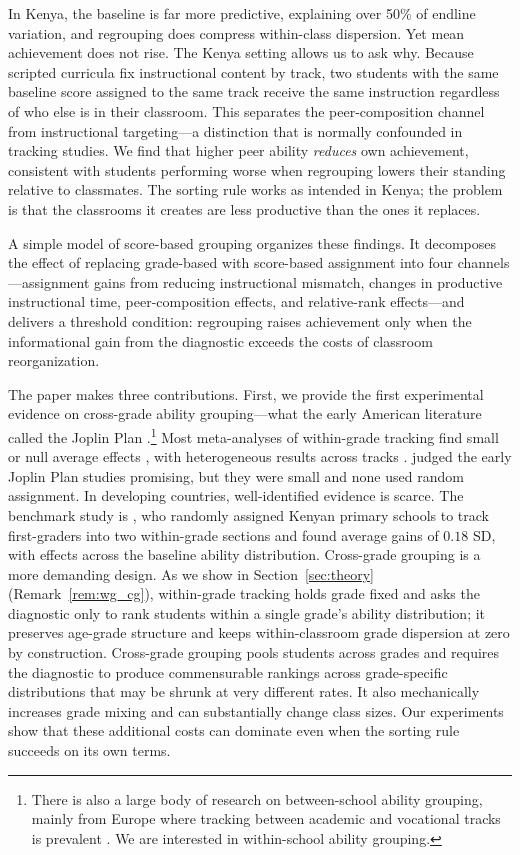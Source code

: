 \documentclass[11pt]{article}
\begin{document}
In Kenya, the baseline is far more predictive, explaining over 50\% of endline variation, and regrouping does compress within-class dispersion. Yet mean achievement does not rise. The Kenya setting allows us to ask why. Because scripted curricula fix instructional content by track, two students with the same baseline score assigned to the same track receive the same instruction regardless of who else is in their classroom. This separates the peer-composition channel from instructional targeting---a distinction that is normally confounded in tracking studies. We find that higher peer ability \emph{reduces} own achievement, consistent with students performing worse when regrouping lowers their standing relative to classmates. The sorting rule works as intended in Kenya; the problem is that the classrooms it creates are less productive than the ones it replaces.

A simple model of score-based grouping organizes these findings. It decomposes the effect of replacing grade-based with score-based assignment into four channels---assignment gains from reducing instructional mismatch, changes in productive instructional time, peer-composition effects, and relative-rank effects---and delivers a threshold condition: regrouping raises achievement only when the informational gain from the diagnostic exceeds the costs of classroom reorganization.

The paper makes three contributions. First, we provide the first experimental evidence on cross-grade ability grouping---what the early American literature called the Joplin Plan \citep{floyd:1954}.\footnote{There is also a large body of research on between-school ability grouping, mainly from Europe where tracking between academic and vocational tracks is prevalent \citep{fu2018ability,lavrijsen2015new}. We are interested in within-school ability grouping.} Most meta-analyses of within-grade tracking find small or null average effects \citep{slavin:1987,slavin1990achievement,kulik1987effects,terrin2022effect}, with heterogeneous results across tracks \citep{burke2013classroom,hoxby2005taking,antecol2016peer,garlick,de2022college}. \citet{slavin:1987} judged the early Joplin Plan studies promising, but they were small and none used random assignment. In developing countries, well-identified evidence is scarce. The benchmark study is \citet{duflo2011peer}, who randomly assigned Kenyan primary schools to track first-graders into two within-grade sections and found average gains of $0.18$ SD, with effects across the baseline ability distribution. Cross-grade grouping is a more demanding design. As we show in Section~\ref{sec:theory} (Remark~\ref{rem:wg_cg}), within-grade tracking holds grade fixed and asks the diagnostic only to rank students within a single grade's ability distribution; it preserves age-grade structure and keeps within-classroom grade dispersion at zero by construction. Cross-grade grouping pools students across grades and requires the diagnostic to produce commensurable rankings across grade-specific distributions that may be shrunk at very different rates. It also mechanically increases grade mixing and can substantially change class sizes. Our experiments show that these additional costs can dominate even when the sorting rule succeeds on its own terms.
\end{document}
